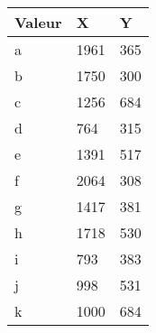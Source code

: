 \documentclass[french]{article}
\begin{document}
\begin{table}[h!]
	\begin{tabular}{|l|l|l|}
		\hline
		Valeur & X    & Y   \\ \hline
		a      & 1961 & 365 \\ \hline
		b      & 1750 & 300 \\ \hline
		c      & 1256 & 684 \\ \hline
		d      & 764  & 315 \\ \hline
		e      & 1391 & 517 \\ \hline
		f      & 2064 & 308 \\ \hline
		g      & 1417 & 381 \\ \hline
		h      & 1718 & 530 \\ \hline
		i      & 793  & 383 \\ \hline
		j      & 998  & 531 \\ \hline
		k      & 1000  & 684 \\ \hline

	\end{tabular}
\end{table}
\end{document}

